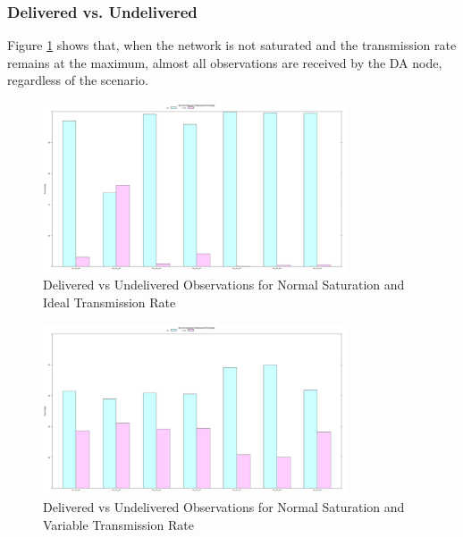 \subsubsection{Delivered vs. Undelivered}
	Figure \ref{fig:sim:res:norm:ideal:delundel} shows that, when the network is not saturated and the transmission rate remains at the maximum, almost all observations are received by the DA node, regardless of the scenario. 
	\begin{figure}[H]
	\centering
	\includegraphics[width=0.8\textwidth]{Chap7/figures/plots/normal_ideal/delvsundel_percent.png}
	\caption{Delivered vs Undelivered Observations for Normal Saturation and Ideal Transmission Rate}
	\label{fig:sim:res:norm:ideal:delundel}
	\end{figure}

	\begin{figure}[H]
	\centering
	\includegraphics[width=0.8\textwidth]{Chap7/figures/plots/normal_variable/delvsundel_percent.png}
	\caption{Delivered vs Undelivered Observations for Normal Saturation and Variable Transmission Rate}
	\label{fig:sim:res:norm:variable:delundel}
	\end{figure}

